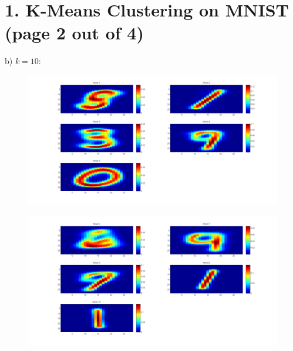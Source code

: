 \documentclass[11pt]{article}
\begin{document}
\section*{1. K-Means Clustering on MNIST (page 2 out of 4)}
b) $k=10$:
\begin{figure}[ht!]
\centering
\includegraphics[width=180mm]{images/mean10-1.png}
\label{overflow}
\end{figure}
\begin{figure}[ht!]
\centering
\includegraphics[width=180mm]{images/mean10-2.png}
\label{overflow}
\end{figure}
\newpage
\end{document}

